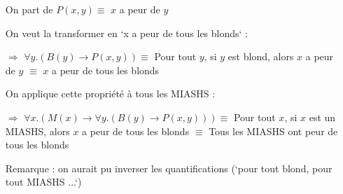 \begin{frame}


\pause\newline

\begin{itemize}
\item[] On part de $P(x,y) \equiv $ $x$ a peur de $y$\pause
\end{itemize}
\vspace{1mm}
\begin{itemize}
\item[] On veut la transformer en `x a peur de tous les blonds` : \pause
\item[$\Rightarrow$] $\forall y. (B(y) \rightarrow P(x,y)) \equiv $ Pour tout $y$, si $y$ est blond, alors $x$ a peur de $y$ \pause $\equiv$ $x$ a peur de tous les blonds\pause
\end{itemize}
\vspace{1mm}
\begin{itemize}
\item[] On applique cette propriété à tous les MIASHS : \pause
\item[$\Rightarrow$] $\forall x. (M(x) \rightarrow \forall y. (B(y) \rightarrow P(x,y))) \equiv  $ Pour tout $x$, si $x$ est un MIASHS, alors $x$ a peur de tous les blonds \pause $\equiv$ Tous les MIASHS ont peur de tous les blonds\pause
\end{itemize}
\vspace{1mm}
\begin{itemize}
\item[] Remarque : on aurait pu inverser les quantifications (`pour tout blond, pour tout MIASHS ...`)
\end{itemize}

\end{frame}


